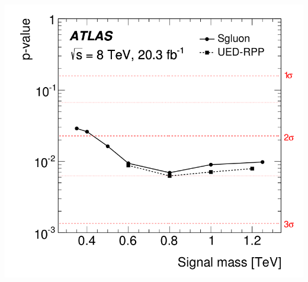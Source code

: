 \begin{frame}
\begin{columns}
\begin{column}{0.5\textwidth}
\begin{center}
\hspace*{-2cm}
\includegraphics[width=0.9\linewidth]{Figures/FourTops/significanceVssignalmass.png}
\end{center}
\end{column}
\end{columns}
\end{frame}


